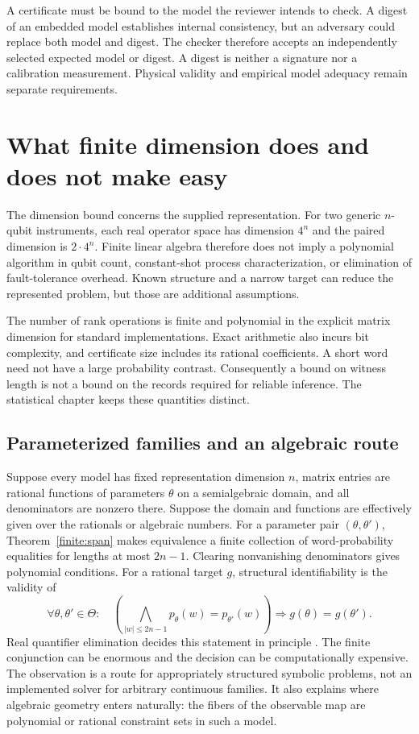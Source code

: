A certificate must be bound to the model the reviewer intends to check.
A digest of an embedded model establishes internal consistency, but an
adversary could replace both model and digest. The checker therefore accepts
an independently selected expected model or digest. A digest is neither a
signature nor a calibration measurement. Physical validity and empirical
model adequacy remain separate requirements.

\section{What finite dimension does and does not make easy}

The dimension bound concerns the supplied representation. For two generic
$n$-qubit instruments, each real operator space has dimension $4^n$ and
the paired dimension is $2\cdot4^n$. Finite linear algebra therefore does
not imply a polynomial algorithm in qubit count, constant-shot process
characterization, or elimination of fault-tolerance overhead. Known
structure and a narrow target can reduce the represented problem, but
those are additional assumptions.

The number of rank operations is finite and polynomial in the explicit
matrix dimension for standard implementations. Exact arithmetic also incurs
bit complexity, and certificate size includes its rational coefficients.
A short word need not have a large probability contrast. Consequently a
bound on witness length is not a bound on the records required for reliable
inference. The statistical chapter keeps these quantities distinct.

\subsection{Parameterized families and an algebraic route}

Suppose every model has fixed representation dimension $n$, matrix entries
are rational functions of parameters $\theta$ on a semialgebraic domain,
and all denominators are nonzero there. Suppose the domain and functions
are effectively given over the rationals or algebraic numbers. For a
parameter pair $(\theta,\theta')$, Theorem~\ref{finite:span} makes
equivalence a finite collection of word-probability equalities for lengths
at most $2n-1$. Clearing nonvanishing denominators gives polynomial
conditions. For a rational target $g$, structural identifiability is the
validity of
\begin{equation}
 \forall\theta,\theta'\in\Theta:\quad
 \left(\bigwedge_{|w|\leq2n-1}p_\theta(w)=p_{\theta'}(w)\right)
 \Longrightarrow g(\theta)=g(\theta').
\end{equation}
Real quantifier elimination decides this statement in principle
\cite{f_basu,f_nemcova}. The finite conjunction can be enormous and the
decision can be computationally expensive. The observation is a route for
appropriately structured symbolic problems, not an implemented solver for
arbitrary continuous families. It also explains where algebraic geometry
enters naturally: the fibers of the observable map are polynomial or
rational constraint sets in such a model.

